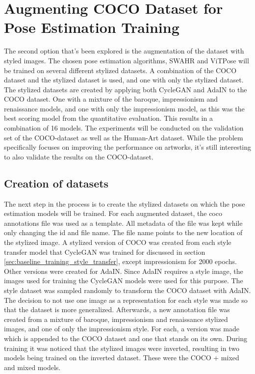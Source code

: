 \section{Augmenting COCO Dataset for Pose Estimation Training}
\label{chap:improvements_augmentation}
The second option that's been explored is the augmentation of the dataset with styled images.
The chosen pose estimation algorithms, SWAHR and ViTPose will be trained on several different stylized datasets.
A combination of the COCO dataset and the stylized dataset is used, and one with only the stylized dataset.
The stylized datasets are created by applying both CycleGAN and AdaIN to the COCO dataset.
One with a mixture of the baroque, impressionism and renaissance models, and one with only the impressionism model, as this was the best scoring model from the quantitative evaluation.
This results in a combination of 16 models.
The experiments will be conducted on the validation set of the COCO-dataset as well as the Human-Art dataset.
While the problem specifically focuses on improving the performance on artworks, it's still interesting to also validate the results on the COCO-dataset.

\subsection{Creation of datasets}
\label{sec:improvements_dataset_pose_estimation}
The next step in the process is to create the stylized datasets on which the pose estimation models will be trained.
For each augmented dataset, the coco annotations file was used as a template.
All metadata of the file was kept while only changing the id and file name.
The file name points to the new location of the stylized image.
A stylized version of COCO was created from each style transfer model that CycleGAN was trained for discussed in section \ref{sec:baseline_training_style_transfer}, except impressionism for 2000 epochs.
Other versions were created for AdaIN.
Since AdaIN requires a style image, the images used for training the CycleGAN models were used for this purpose.
The style dataset was sampled randomly to transform the COCO dataset with AdaIN.
The decision to not use one image as a representation for each style was made so that the dataset is more generalized.
Afterwards, a new annotation file was created from a mixture of baroque, impressionism and renaissance stylized images, and one of only the impressionism style.
For each, a version was made which is appended to the COCO dataset and one that stands on its own.
During training it was noticed that the stylized images were inverted, resulting in two models being trained on the inverted dataset.
These were the COCO + mixed and mixed models.

